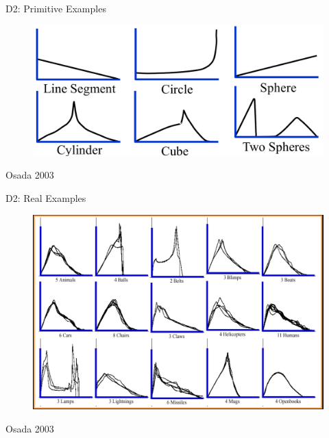 \documentclass{beamer}
\begin{document}
\begin{frame}{D2: Primitive Examples}

\begin{figure}[t]
	\centering
    \includegraphics[width=\textwidth]{D2PrimitiveExamples.png}
\end{figure}

\small Osada 2003
\end{frame}

\begin{frame}{D2: Real Examples}

\begin{figure}[t]
	\centering
    \includegraphics[width=\textwidth]{D2RealExamples.png}
\end{figure}

\small Osada 2003
\end{frame}
\end{document}
